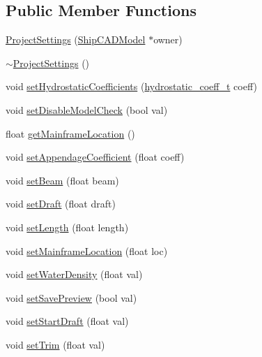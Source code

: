 \subsection*{Public Member Functions}
\begin{DoxyCompactItemize}
\item 
\hyperlink{classShipCAD_1_1ProjectSettings_a55001252531c21f4ccc89d8df9c6b184}{Project\-Settings} (\hyperlink{classShipCAD_1_1ShipCADModel}{Ship\-C\-A\-D\-Model} $\ast$owner)
\item 
\hyperlink{classShipCAD_1_1ProjectSettings_a4c74ba587e58e538083072285937aa4c}{$\sim$\-Project\-Settings} ()
\item 
void \hyperlink{classShipCAD_1_1ProjectSettings_ab729e778076b560d876f09955212256d}{set\-Hydrostatic\-Coefficients} (\hyperlink{namespaceShipCAD_a9cf77f0900561de9efc572dcbad4dbbd}{hydrostatic\-\_\-coeff\-\_\-t} coeff)
\item 
void \hyperlink{classShipCAD_1_1ProjectSettings_ab9f9f88bba11a2093204affd18df17ab}{set\-Disable\-Model\-Check} (bool val)
\item 
float \hyperlink{classShipCAD_1_1ProjectSettings_a4dddaf7fe8bdbc0724c524244dd56497}{get\-Mainframe\-Location} ()
\item 
void \hyperlink{classShipCAD_1_1ProjectSettings_a31fdcc5990fb3c61161fe783b5ed4939}{set\-Appendage\-Coefficient} (float coeff)
\item 
void \hyperlink{classShipCAD_1_1ProjectSettings_ac90d2a093ae0af951fd117d7f6981e92}{set\-Beam} (float beam)
\item 
void \hyperlink{classShipCAD_1_1ProjectSettings_a16a64f2a4a9b6359ac46b0a85f90a4ae}{set\-Draft} (float draft)
\item 
void \hyperlink{classShipCAD_1_1ProjectSettings_aad72cb11575e7a1ae0cda2c50f8de2ad}{set\-Length} (float length)
\item 
void \hyperlink{classShipCAD_1_1ProjectSettings_acac72dbc1dc2f68c1d32981ac9a27603}{set\-Mainframe\-Location} (float loc)
\item 
void \hyperlink{classShipCAD_1_1ProjectSettings_af4de74cc452581cf8f7e02431ba3e45a}{set\-Water\-Density} (float val)
\item 
void \hyperlink{classShipCAD_1_1ProjectSettings_a3590a9b52236a4aeb9991ea03c518871}{set\-Save\-Preview} (bool val)
\item 
void \hyperlink{classShipCAD_1_1ProjectSettings_a9e389573e2266b099f49452d68edf24f}{set\-Start\-Draft} (float val)
\item 
void \hyperlink{classShipCAD_1_1ProjectSettings_afdab155f3ca324b3c200a97c9ade1ff6}{set\-Trim} (float val)

\end{DoxyCompactItemize}
